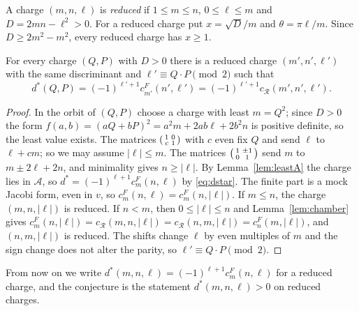 \begin{definition}
A charge $(m,n,\ell)$ is \emph{reduced} if $1\le m\le n$, $0\le\ell\le m$ and $D=2mn-\ell^2>0$. For a reduced charge put $x=\sqrt D/m$ and $\theta=\pi\ell/m$. Since $D\ge2m^2-m^2$, every reduced charge has $x\ge1$.
\end{definition}

\begin{proposition}\label{prop:reduction}
For every charge $(Q,P)$ with $D>0$ there is a reduced charge $(m',n',\ell')$ with the same discriminant and $\ell'\equiv Q\cdot P\pmod2$ such that
\[
d^*(Q,P)=(-1)^{\ell'+1}c^F_{m'}(n',\ell')=(-1)^{\ell'+1}c_{\mathcal R}(m',n',\ell').
\]
\end{proposition}

\begin{proof}
In the orbit of $(Q,P)$ choose a charge with least $m=Q^2$; since $D>0$ the form $f(a,b)=(aQ+bP)^2=a^2m+2ab\ell+2b^2n$ is positive definite, so the least value exists. The matrices $\begin{psmallmatrix}1&0\\c&1\end{psmallmatrix}$ with $c$ even fix $Q$ and send $\ell$ to $\ell+cm$; so we may assume $|\ell|\le m$. The matrices $\begin{psmallmatrix}1&\pm1\\0&1\end{psmallmatrix}$ send $m$ to $m\pm2\ell+2n$, and minimality gives $n\ge|\ell|$. By Lemma~\ref{lem:leastA} the charge lies in $\mathcal A$, so $d^*=(-1)^{\ell+1}c^F_m(n,\ell)$ by \eqref{eq:dstar}. The finite part is a mock Jacobi form, even in $v$, so $c^F_m(n,\ell)=c^F_m(n,|\ell|)$. If $m\le n$, the charge $(m,n,|\ell|)$ is reduced. If $n<m$, then $0\le|\ell|\le n$ and Lemma~\ref{lem:chamber} gives $c^F_m(n,|\ell|)=c_{\mathcal R}(m,n,|\ell|)=c_{\mathcal R}(n,m,|\ell|)=c^F_n(m,|\ell|)$, and $(n,m,|\ell|)$ is reduced. The shifts change $\ell$ by even multiples of $m$ and the sign change does not alter the parity, so $\ell'\equiv Q\cdot P\pmod2$.
\end{proof}

From now on we write $d^*(m,n,\ell)=(-1)^{\ell+1}c^F_m(n,\ell)$ for a reduced charge, and the conjecture is the statement $d^*(m,n,\ell)>0$ on reduced charges.


